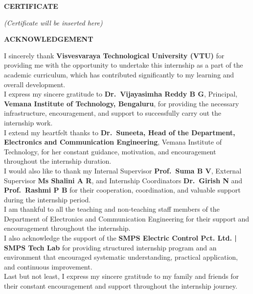 \documentclass[12pt,a4paper,twocolumn,fleqn]{article}
\begin{document}
\newpage
{}
\setcounter{page}{1}
\pagestyle{plain}

\begin{center}
{\Large \textbf{CERTIFICATE}}\\[1cm]
\end{center}

\vspace{2cm}

\begin{center}

\vspace{10cm}

\textit{(Certificate will be inserted here)}
\end{center}

\vfill
\newpage
\begin{center}
{\Large \textbf{ACKNOWLEDGEMENT}}\\[1cm]
\end{center}

\noindent
I sincerely thank \textbf{Visvesvaraya Technological University (VTU)} for providing me with the opportunity to undertake this internship as a part of the academic curriculum, which has contributed significantly to my learning and overall development. \\[5mm]
\noindent
I express my sincere gratitude to \textbf{Dr.\ Vijayasimha Reddy B G}, Principal, \textbf{Vemana Institute of Technology, Bengaluru}, for providing the necessary infrastructure, encouragement, and support to successfully carry out the internship work. \\[5mm]
\noindent
I extend my heartfelt thanks to \textbf{Dr.\ Suneeta, Head of the Department, Electronics and Communication Engineering}, Vemana Institute of Technology, for her constant guidance, motivation, and encouragement throughout the internship duration. \\[5mm]
\noindent
I would also like to thank my Internal Supervisor \textbf{Prof.\ Suma B V}, External Supervisor \textbf{Ms Shalini A R}, and Internship Coordinators \textbf{Dr.\ Girish N} and \textbf{Prof.\ Rashmi P B} for their cooperation, coordination, and valuable support during the internship period. \\[5mm]
\noindent
I am thankful to all the teaching and non-teaching staff members of the Department of Electronics and Communication Engineering for their support and encouragement throughout the internship. \\[5mm]
\noindent
I also acknowledge the support of the \textbf{SMPS Electric Control Pct. Ltd. | SMPS Tech Lab} for providing structured internship program and an environment that encouraged systematic understanding, practical application, and continuous improvement. \\[5mm]
\noindent
Last but not least, I express my sincere gratitude to my family and friends for their constant encouragement and support throughout the internship journey.
\vfill
\end{document}
